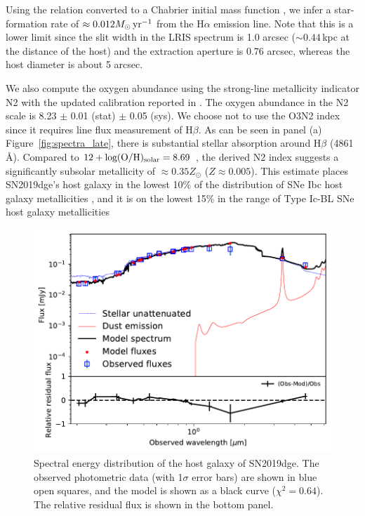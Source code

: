 \documentclass[twocolumn]{aastex63}
\newcommand{\name}{SN2019dge}
\begin{document}
\begin{CJK*}{UTF8}{gbsn}
Using the \citet{Kennicutt1998} relation converted to a Chabrier initial mass function 
\citep{Chabrier2003, Madau2014}, we infer a star-formation rate of $\approx 0.012 M_\odot\, {\rm 
yr^{-1}}$ from the H$\alpha$ emission line. Note that this is a lower limit since the slit width in the 
LRIS spectrum is 1.0 arcsec ($\sim 0.44$\,kpc at the distance of the host) and the extraction aperture 
is 0.76 arcsec, whereas the host diameter is about 5 arcsec.

We also compute the oxygen abundance using the 
strong-line metallicity indicator N2 \citep{Pettini2004} with the updated calibration reported in 
\citet{Marino2013}. The oxygen abundance in the N2 scale is 8.23 $\pm$ 0.01 (stat) $\pm$ 0.05 (sys). 
We choose not to use the O3N2 index since it requires line flux measurement of H$\beta$. As can be 
seen in panel (a) Figure~\ref{fig:spectra_late}, there is substantial stellar absorption around H$\beta$ 
(4861\,\AA). Compared to $12+{\rm log(O/H)_{\rm solar}} = 8.69$ 
\citep{Asplund2009}, the derived N2 index suggests a significantly subsolar metallicity of $\approx 
0.35 Z_\odot$ ($Z\approx 0.005$). This estimate places \name's host galaxy in the lowest 
10\% of the distribution of SNe Ibc host galaxy metallicities \citep{Sanders2012}, and it is on the lowest 
15\% in the range of Type Ic-BL SNe host galaxy metallicities \citep{Modjaz2020}

\begin{figure}[htbp!]
	\centering
	\includegraphics[width=\columnwidth]{figures/SDSSJ17+50_best_model.pdf}
	\caption{Spectral energy distribution of the host galaxy of \name. The observed photometric 
		data (with 1$\sigma$ error bars) are shown in blue open squares, and the 
		model is shown as a black curve ($\chi^2 = 0.64$). The relative residual flux is shown in the 
		bottom panel.
		\label{fig:SEDfit}}
\end{figure}


\end{CJK*}
\end{document}
